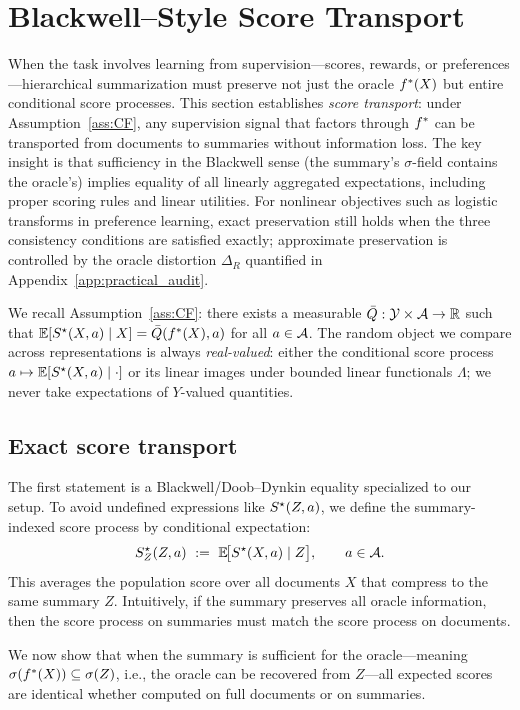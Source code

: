 \section{Blackwell–Style Score Transport}
\label{app:blackwell}

When the task involves learning from supervision—scores, rewards, or preferences—hierarchical summarization must preserve not just the oracle $f^{\ast}(X)$ but entire conditional score processes. This section establishes \emph{score transport}: under Assumption~\ref{ass:CF}, any supervision signal that factors through $f^{\ast}$ can be transported from documents to summaries without information loss. The key insight is that sufficiency in the Blackwell sense (the summary's $\sigma$-field contains the oracle's) implies equality of all linearly aggregated expectations, including proper scoring rules and linear utilities. For nonlinear objectives such as logistic transforms in preference learning, exact preservation still holds when the three consistency conditions are satisfied exactly; approximate preservation is controlled by the oracle distortion $\Delta_R$ quantified in Appendix~\ref{app:practical_audit}.

We recall Assumption~\ref{ass:CF}: there exists a measurable $\bar Q:\mathcal{Y}\times\mathcal{A}\to\mathbb{R}$ such that
$\mathbb{E}[S^\star(X,a)\mid X]=\bar Q(f^{\ast}(X),a)$ for all $a\in\mathcal{A}$. The random object we compare across representations is always \emph{real-valued}: either the conditional score process $a\mapsto \mathbb{E}[S^\star(X,a)\mid \cdot]$ or its linear images under bounded linear functionals $\Lambda$; we never take expectations of $Y$-valued quantities.

\subsection*{Exact score transport}

The first statement is a Blackwell/Doob–Dynkin equality specialized to our setup. To avoid undefined expressions like $S^\star(Z,a)$, we define the summary-indexed score process by conditional expectation:
\[
S^\star_Z(Z,a)\ :=\ \mathbb{E}\!\big[S^\star(X,a)\mid Z\big],
\qquad a\in\mathcal{A}.
\]
This averages the population score over all documents $X$ that compress to the same summary $Z$. Intuitively, if the summary preserves all oracle information, then the score process on summaries must match the score process on documents.

We now show that when the summary is sufficient for the oracle—meaning $\sigma(f^{\ast}(X))\subseteq\sigma(Z)$, i.e., the oracle can be recovered from $Z$—all expected scores are identical whether computed on full documents or on summaries.

